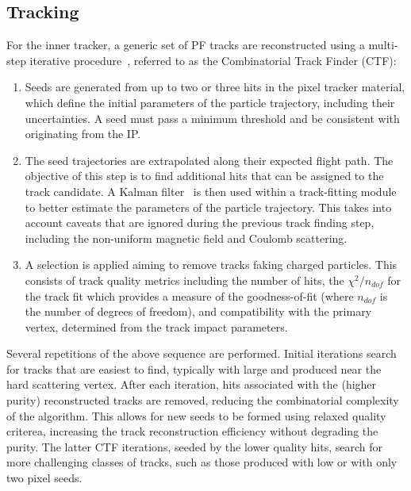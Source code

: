 \subsection{Tracking}

For the inner tracker, a generic set of PF tracks are reconstructed using a multi-step iterative procedure~\cite{track_building}, referred to as the Combinatorial Track Finder (CTF):

\begin{enumerate}
    \item Seeds are generated from up to two or three hits in the pixel tracker material, which define the initial parameters of the particle trajectory, including their uncertainties. A seed must pass a minimum \pt threshold and be consistent with originating from the IP. %
    \item The seed trajectories are extrapolated along their expected flight path. The objective of this step is to find additional hits that can be assigned to the track candidate. A Kalman filter~\cite{kalmanFilter} is then used within a track-fitting module to better estimate the parameters of the particle trajectory. This takes into account caveats that are ignored during the previous track finding step, including the non-uniform magnetic field and Coulomb scattering. %
    \item A selection is applied aiming to remove tracks faking charged particles. This consists of track quality metrics including the number of hits, the $\chi^{2}/n_{dof}$ for the track fit which provides a measure of the goodness-of-fit (where $n_{dof}$ is the number of degrees of freedom), and compatibility with the primary vertex, determined from the track impact parameters. %
\end{enumerate}

\noindent Several repetitions of the above sequence are performed. Initial iterations search for tracks that are easiest to find, typically with large \pt and produced near the hard scattering vertex. After each iteration, hits associated with the (higher purity) reconstructed tracks are removed, reducing the combinatorial complexity of the algorithm. This allows for new seeds to be formed using relaxed quality criterea, increasing the track reconstruction efficiency without degrading the purity. The latter CTF iterations, seeded by the lower quality hits, search for more challenging classes of tracks, such as those produced with low \pt or with only two pixel seeds. 

